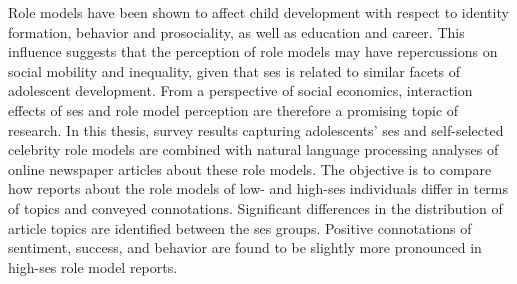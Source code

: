 Role models have been shown to affect child development with respect to identity formation, behavior and prosociality, as well as education and career. 
This influence suggests that the perception of role models may have repercussions on social mobility and inequality, given that \gls{ses} is related to similar facets of adolescent development.
From a perspective of social economics, interaction effects of \gls{ses} and role model perception are therefore a promising topic of research.
In this thesis, survey results capturing adolescents' \gls{ses} and self-selected celebrity role models are combined with natural language processing analyses of online newspaper articles about these role models.
The objective is to compare how reports about the role models of low- and high-\gls{ses} individuals differ in terms of topics and conveyed connotations.
Significant differences in the distribution of article topics are identified between the \gls{ses} groups. Positive connotations of sentiment, success, and behavior are found to be slightly more pronounced in high-\gls{ses} role model reports.


\glsresetall